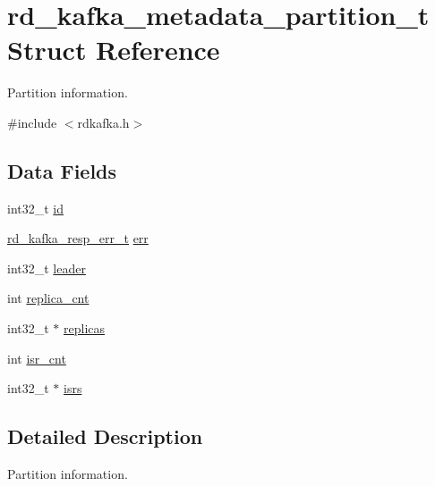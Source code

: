 \hypertarget{structrd__kafka__metadata__partition__t}{
\section{rd\_\-kafka\_\-metadata\_\-partition\_\-t Struct Reference}
\label{structrd__kafka__metadata__partition__t}
}


Partition information.  


{\ttfamily \#include $<$rdkafka.h$>$}\subsection*{Data Fields}
\begin{DoxyCompactItemize}
\item 
int32\_\-t \hyperlink{structrd__kafka__metadata__partition__t_ad76c23a795a752dfdea2ca69236e7f29}{id}
\item 
\hyperlink{rdkafka_8h_a03509bab51072c72a8dcf52337e6d5cb}{rd\_\-kafka\_\-resp\_\-err\_\-t} \hyperlink{structrd__kafka__metadata__partition__t_abc667de1e28c6be4aece698806ca6e09}{err}
\item 
int32\_\-t \hyperlink{structrd__kafka__metadata__partition__t_a6c068b9f40bae19de020ce0c8cfc8053}{leader}
\item 
int \hyperlink{structrd__kafka__metadata__partition__t_a999ac89d23012cfc5ba8acc351300506}{replica\_\-cnt}
\item 
int32\_\-t $\ast$ \hyperlink{structrd__kafka__metadata__partition__t_ae06053cbbeb9bdcf324606cf19a00e7f}{replicas}
\item 
int \hyperlink{structrd__kafka__metadata__partition__t_ac49c0e74551f6398bfa04245b49230d8}{isr\_\-cnt}
\item 
int32\_\-t $\ast$ \hyperlink{structrd__kafka__metadata__partition__t_a82d9888272c26a78836f12827ffc1a64}{isrs}
\end{DoxyCompactItemize}


\subsection{Detailed Description}
Partition information. 

